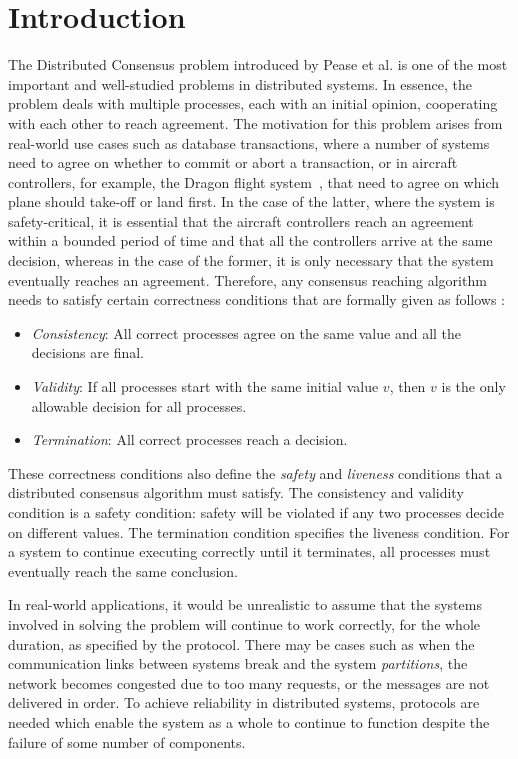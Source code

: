 ﻿
\section{Introduction}

The Distributed Consensus problem introduced by Pease et al.
\cite{PeaseSL80} is one of the most important and well-studied problems in
distributed systems. In essence, the problem deals with multiple processes,
each with an initial opinion, cooperating with each other to reach agreement.
The motivation for this problem arises from real-world use cases such as database
transactions, where a number of systems need to agree on whether to commit or
abort a transaction, or in aircraft controllers, for example, the Dragon flight system~\cite{dfs}, that need to agree on which
plane should take-off or land first. In the case of the latter, where the
system is safety-critical, it is essential that the aircraft controllers reach
an agreement within a bounded period of time and that all the controllers
arrive at the same decision, whereas in the case of the former, it is only
necessary that the system eventually reaches an agreement. Therefore, any
consensus reaching algorithm needs to satisfy certain correctness conditions
that are formally given as follows \cite{PeaseSL80}:

\begin{itemize} \item \textit{Consistency}: All correct processes agree on the
        same value and all the decisions are final.  
    \item \textit{Validity}:
        If all processes start with the same initial value $v$, then $v$ is the
    only allowable decision for all processes.  
\item \textit{Termination}: All
        correct processes reach a decision.  \end{itemize}


These correctness conditions also define the \textit{safety} and \textit{liveness}
conditions that a distributed consensus algorithm must satisfy.  The
consistency and validity condition is a safety condition: safety will be
violated if any two processes decide on different values. The termination
condition specifies the liveness condition. For a system to continue executing
correctly until it terminates, all processes must eventually reach the same
conclusion.

In real-world applications, it would be unrealistic to assume that the systems
involved in solving the problem will continue to work correctly, for the whole
duration, as specified by the protocol. There may be cases such as when the
communication links between systems break and the system \textit{partitions},
the network becomes congested due to too many requests, or the messages are not
delivered in order. To achieve reliability in distributed systems, protocols
are needed which enable the system as a whole to continue to function despite
the failure of some number of components. 

